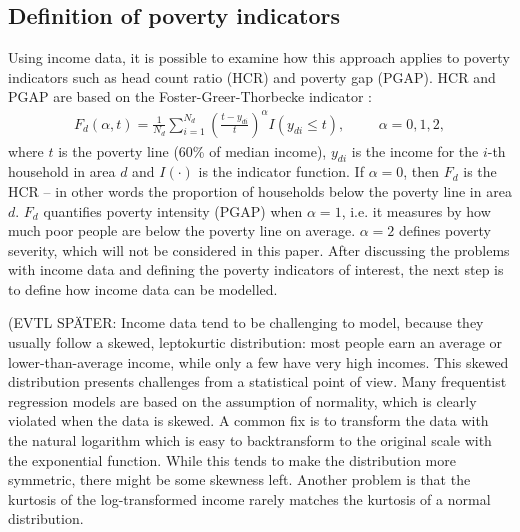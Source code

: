 \subsection{Definition of poverty indicators}


Using income data, it is possible to examine how this approach applies to poverty indicators such as head count ratio (HCR) and poverty gap (PGAP). HCR and PGAP are based on the Foster-Greer-Thorbecke indicator \citep{foster_class_1984}:
\begin{gather*}
   F_d(\alpha, t) = \displaystyle \frac 1 {N_d} \sum_{i=1}^{N_d}\left( \frac{t - y_{di}}{t} \right)^\alpha I (y_{di} \le t),
   \hspace{1cm}\alpha = 0, 1, 2,
\end{gather*}
where $t$ is the poverty line (60\% of median income), $y_{di}$ is the income for the $i$-th household in area $d$ and $I(\cdot)$ is the indicator function. If $\alpha = 0$, then $F_d$ is the HCR – in other words the proportion of households below the poverty line in area $d$. $F_d$ quantifies poverty intensity (PGAP) when $\alpha = 1$, i.e. it measures by how much poor people are below the poverty line on average. $\alpha = 2$ defines poverty severity, which will not be considered in this paper. After discussing the problems with income data and defining the poverty indicators of interest, the next step is to define how income data can be modelled.

(EVTL SPÄTER: Income data tend to be challenging to model, because they usually follow a skewed, leptokurtic distribution: most people earn an average or lower-than-average income, while only a few have very high incomes. This skewed distribution presents challenges from a statistical point of view. Many frequentist regression models are based on the assumption of normality, which is clearly violated when the data is skewed.
A common fix is to transform the data with the natural logarithm which is easy to backtransform to the original scale with the exponential function. While this tends to make the distribution more symmetric, there might be some skewness left. Another problem is that the kurtosis of the log-transformed income rarely matches the kurtosis of a normal distribution.

